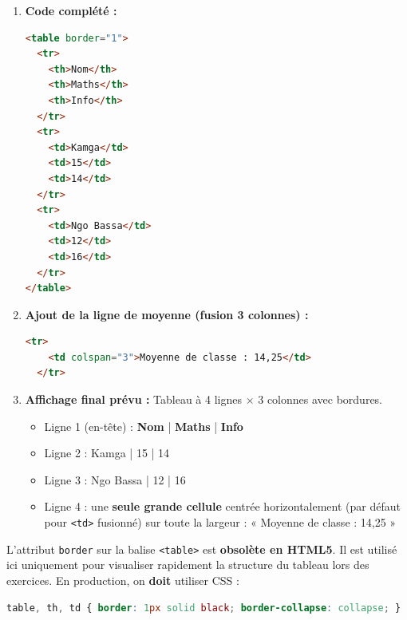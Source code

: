 \documentclass[11pt]{article}
\begin{document}
\begin{corrige}
\begin{enumerate}
  \item \textbf{Code complété :}
\begin{lstlisting}[language=HTML]
<table border="1">
  <tr>
    <th>Nom</th>
    <th>Maths</th>
    <th>Info</th>
  </tr>
  <tr>
    <td>Kamga</td>
    <td>15</td>
    <td>14</td>
  </tr>
  <tr>
    <td>Ngo Bassa</td>
    <td>12</td>
    <td>16</td>
  </tr>
</table>
\end{lstlisting}
  \item \textbf{Ajout de la ligne de moyenne (fusion 3 colonnes) :}
\begin{lstlisting}[language=HTML]
  <tr>
    <td colspan="3">Moyenne de classe : 14,25</td>
  </tr>
\end{lstlisting}
  \item \textbf{Affichage final prévu :} Tableau à 4 lignes $\times$ 3 colonnes avec bordures.
  \begin{itemize}
    \item Ligne 1 (en-tête) : \textbf{Nom} | \textbf{Maths} | \textbf{Info}
    \item Ligne 2 : Kamga | 15 | 14
    \item Ligne 3 : Ngo Bassa | 12 | 16
    \item Ligne 4 : une \textbf{seule grande cellule} centrée horizontalement (par défaut pour \texttt{<td>} fusionné) sur toute la largeur : « Moyenne de classe : 14,25 »
  \end{itemize}
\end{enumerate}

\begin{attention}
L'attribut \texttt{border} sur la balise \texttt{<table>} est \textbf{obsolète en HTML5}. Il est utilisé ici uniquement pour visualiser rapidement la structure du tableau lors des exercices. En production, on \textbf{doit} utiliser CSS :
\begin{lstlisting}[language=CSS]
table, th, td { border: 1px solid black; border-collapse: collapse; }
\end{lstlisting}
\end{attention}
\end{corrige}
\end{document}
